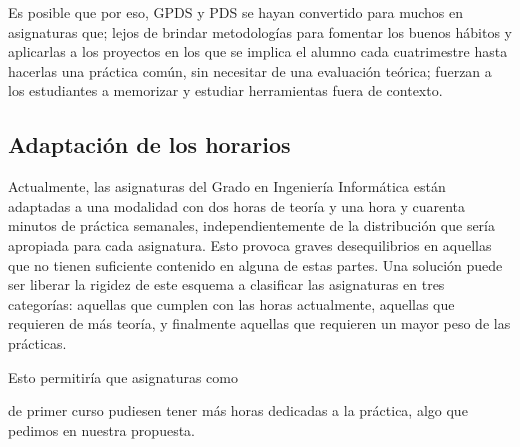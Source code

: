 Es posible que por eso, GPDS y PDS se hayan convertido para muchos
en asignaturas que;
lejos de brindar metodologías para fomentar los buenos hábitos
y aplicarlas a los proyectos en los que se implica el alumno cada cuatrimestre
hasta hacerlas una práctica común,
sin necesitar de una evaluación teórica;
fuerzan a los estudiantes a memorizar y estudiar herramientas fuera de contexto.

\subsection{Adaptación de los horarios}

Actualmente,
las asignaturas del Grado en Ingeniería Informática
están adaptadas a una modalidad con dos horas de
teoría y una hora y cuarenta minutos de práctica semanales,
independientemente de la distribución que sería apropiada para cada asignatura.
Esto provoca graves desequilibrios en aquellas que
no tienen suficiente contenido en alguna de estas partes.
Una solución puede ser liberar la rigidez de este
esquema a clasificar las asignaturas en tres categorías:
aquellas que cumplen con las horas actualmente,
aquellas que requieren de más teoría,
y finalmente aquellas que requieren un mayor peso de las prácticas.

Esto permitiría que asignaturas como
\subject{Introducción a la Programación} de primer curso
pudiesen tener más horas dedicadas a la práctica,
algo que pedimos en nuestra propuesta.



